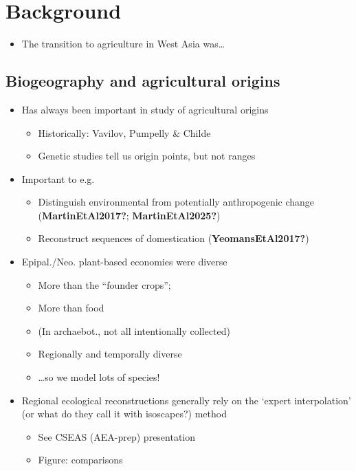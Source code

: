 \documentclass[
  number,
  review]{elsarticle}
\providecommand{\tightlist}{%
  \setlength{\itemsep}{0pt}\setlength{\parskip}{0pt}}\usepackage{longtable,booktabs,array}
\begin{document}
\section{Background}\label{background}

\begin{itemize}
\tightlist
\item
  The transition to agriculture in West Asia was\ldots{}
\end{itemize}

\subsection{Biogeography and agricultural
origins}\label{biogeography-and-agricultural-origins}

\begin{itemize}
\tightlist
\item
  Has always been important in study of agricultural origins

  \begin{itemize}
  \tightlist
  \item
    Historically: Vavilov, Pumpelly \& Childe
  \item
    Genetic studies tell us origin points, but not ranges
  \end{itemize}
\item
  Important to e.g.

  \begin{itemize}
  \tightlist
  \item
    Distinguish environmental from potentially anthropogenic change
    (\textbf{MartinEtAl2017?}; \textbf{MartinEtAl2025?})
  \item
    Reconstruct sequences of domestication (\textbf{YeomansEtAl2017?})
  \end{itemize}
\item
  Epipal./Neo. plant-based economies were diverse

  \begin{itemize}
  \tightlist
  \item
    More than the ``founder crops'';
  \item
    More than food
  \item
    (In archaebot., not all intentionally collected)
  \item
    Regionally and temporally diverse
  \item
    \ldots so we model lots of species!
  \end{itemize}
\item
  Regional ecological reconstructions generally rely on the `expert
  interpolation' (or what do they call it with isoscapes?) method

  \begin{itemize}
  \tightlist
  \item
    See CSEAS (AEA-prep) presentation
  \item
    Figure: comparisons
  \end{itemize}
\end{itemize}
\end{document}
